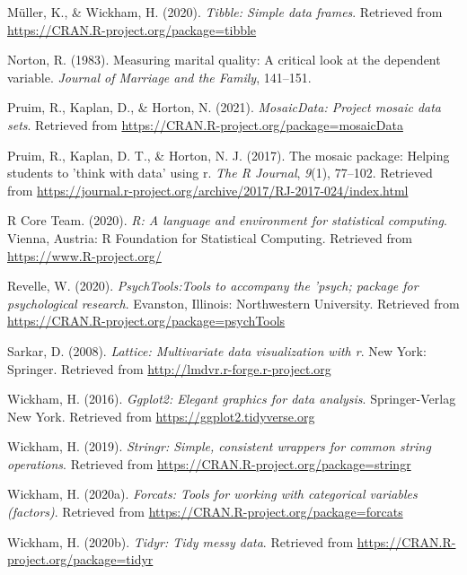 \documentclass[
  english,
  man]{apa6}
\newlength{\cslhangindent}
\newenvironment{cslreferences}%
  {\setlength{\parindent}{0pt}%
  \everypar{\setlength{\hangindent}{\cslhangindent}}\ignorespaces}%
  {\par}
\begin{document}
\begin{cslreferences}
\leavevmode\hypertarget{ref-R-tibble}{}%
Müller, K., \& Wickham, H. (2020). \emph{Tibble: Simple data frames}. Retrieved from \url{https://CRAN.R-project.org/package=tibble}

\leavevmode\hypertarget{ref-norton1983measuring}{}%
Norton, R. (1983). Measuring marital quality: A critical look at the dependent variable. \emph{Journal of Marriage and the Family}, 141--151.

\leavevmode\hypertarget{ref-R-mosaicData}{}%
Pruim, R., Kaplan, D., \& Horton, N. (2021). \emph{MosaicData: Project mosaic data sets}. Retrieved from \url{https://CRAN.R-project.org/package=mosaicData}

\leavevmode\hypertarget{ref-R-mosaic}{}%
Pruim, R., Kaplan, D. T., \& Horton, N. J. (2017). The mosaic package: Helping students to 'think with data' using r. \emph{The R Journal}, \emph{9}(1), 77--102. Retrieved from \url{https://journal.r-project.org/archive/2017/RJ-2017-024/index.html}

\leavevmode\hypertarget{ref-R-base}{}%
R Core Team. (2020). \emph{R: A language and environment for statistical computing}. Vienna, Austria: R Foundation for Statistical Computing. Retrieved from \url{https://www.R-project.org/}

\leavevmode\hypertarget{ref-R-psychTools}{}%
Revelle, W. (2020). \emph{PsychTools:Tools to accompany the 'psych; package for psychological research}. Evanston, Illinois: Northwestern University. Retrieved from \url{https://CRAN.R-project.org/package=psychTools}

\leavevmode\hypertarget{ref-R-lattice}{}%
Sarkar, D. (2008). \emph{Lattice: Multivariate data visualization with r}. New York: Springer. Retrieved from \url{http://lmdvr.r-forge.r-project.org}

\leavevmode\hypertarget{ref-R-ggplot2}{}%
Wickham, H. (2016). \emph{Ggplot2: Elegant graphics for data analysis}. Springer-Verlag New York. Retrieved from \url{https://ggplot2.tidyverse.org}

\leavevmode\hypertarget{ref-R-stringr}{}%
Wickham, H. (2019). \emph{Stringr: Simple, consistent wrappers for common string operations}. Retrieved from \url{https://CRAN.R-project.org/package=stringr}

\leavevmode\hypertarget{ref-R-forcats}{}%
Wickham, H. (2020a). \emph{Forcats: Tools for working with categorical variables (factors)}. Retrieved from \url{https://CRAN.R-project.org/package=forcats}

\leavevmode\hypertarget{ref-R-tidyr}{}%
Wickham, H. (2020b). \emph{Tidyr: Tidy messy data}. Retrieved from \url{https://CRAN.R-project.org/package=tidyr}


\end{cslreferences}
\end{document}
